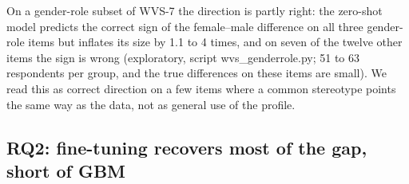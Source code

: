 \documentclass[conference]{IEEEtran}
\begin{document}
On a gender-role subset of WVS-7 the direction is partly right: the zero-shot model predicts the correct sign of the female--male difference on all three gender-role items but inflates its size by 1.1 to 4 times, and on seven of the twelve other items the sign is wrong (exploratory, script wvs\_genderrole.py; 51 to 63 respondents per group, and the true differences on these items are small). We read this as correct direction on a few items where a common stereotype points the same way as the data, not as general use of the profile.

\subsection{RQ2: fine-tuning recovers most of the gap, short of GBM}

\begin{table}[!t]
\caption{Pew fold-0 results, 46{,}209 held-out answers from 6{,}000 respondents. $^\dagger$MAE on ordinal items. $^\S$Error of the predicted subgroup-mean answer on a $[0,1]$ scale (hard predictions).}
\label{tab:pewoverall}
\centering
\footnotesize

\end{table}

\begin{table}[!t]
\caption{Pew fold 0: accuracy (\%) per item on the eight trained questions ($K$: number of options; 46{,}209 test answers in total). $^\ddagger$Whether being of one's religion is mainly a matter of ancestry, belief or practice.}
\label{tab:items}
\centering
\footnotesize

\end{table}

\begin{table}[!t]
\caption{Subgroup accuracy gap (best minus worst category, points) on Pew fold 0, with the permutation $p$-value for the fine-tuned model and its difference from GBM's gap.}
\label{tab:gaps}
\centering
\scriptsize

\end{table}

\begin{table}[!t]
\caption{Concentration and dispersion on Pew fold 0. Top share: mean share of the most frequent predicted answer per item; TV: total-variation distance of the predicted from the true answer marginal; SD ret.: standard deviation of predictions relative to the truth; Gap infl.: median ratio of predicted to true between-group differences (hard predictions).}
\label{tab:conc}
\centering
\scriptsize

\end{table}
\end{document}
